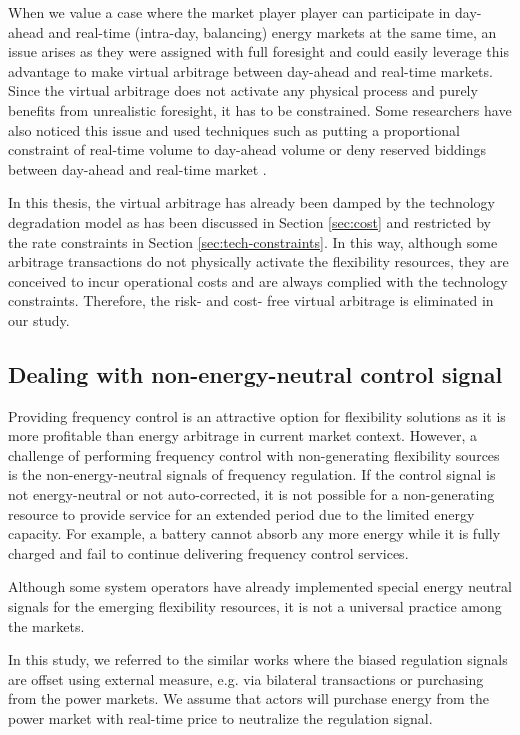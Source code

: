 When we value a case where the market player player can participate in day-ahead and real-time (intra-day, balancing) energy markets at the same time, an issue arises as they were assigned with full foresight and could easily leverage this advantage to make virtual arbitrage between day-ahead and real-time markets. Since the virtual arbitrage does not activate any physical process and purely benefits from unrealistic foresight, it has to be constrained. Some researchers have also noticed this issue and used techniques such as putting a proportional constraint of real-time volume to day-ahead volume \cite{Han2017} or deny reserved biddings between day-ahead and real-time market \cite{Berrada2016}.

In this thesis, the virtual arbitrage has already been damped by the technology degradation model as has been discussed in Section \ref{sec:cost} and restricted by the rate constraints in Section \ref{sec:tech-constraints}. In this way, although some arbitrage transactions do not physically activate the flexibility resources, they are conceived to incur operational costs and are always complied with the technology constraints. Therefore, the risk- and cost- free virtual arbitrage is eliminated in our study.

\subsection{Dealing with non-energy-neutral control signal}
\label{sec:neutral}
Providing frequency control is an attractive option for flexibility solutions as it is more profitable than energy arbitrage in current market context. However, a challenge of performing frequency control with non-generating flexibility sources is the non-energy-neutral signals of frequency regulation. If the control signal is not energy-neutral or not auto-corrected, it is not possible for a non-generating resource to provide service for an extended period due to the limited energy capacity. For example, a battery cannot absorb any more energy while it is fully charged and fail to continue delivering frequency control services.

Although some system operators have already implemented special energy neutral signals for the emerging flexibility resources, it is not a universal practice among the markets. 

In this study, we referred to the similar works \cite{Megel2017}\cite{Oudalov2007}\cite{Borsche2013}\cite{Jin2014} where the biased regulation signals are offset using external measure, e.g. via bilateral transactions or purchasing from the power markets. We assume that actors will purchase energy from the power market with real-time price to neutralize the regulation signal.

